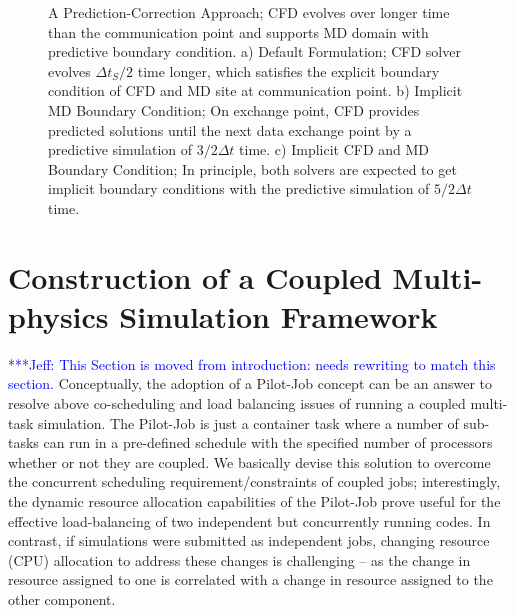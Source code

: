 \documentclass[conference,final]{IEEEtran}
\newcommand{\skonote}[1]{ {\textcolor{blue} { ***Jeff: #1 }}}
\newcommand{\skonote}[1]{}
\begin{document}
\begin{figure}[ht]
\vskip-0.2cm
\caption{\small A Prediction-Correction Approach; CFD evolves over longer time than the communication point and supports MD domain with predictive boundary condition. a) Default Formulation; CFD solver evolves $\Delta t_S / 2$ time longer, which satisfies the explicit boundary condition of CFD and MD site at communication point. b) Implicit MD Boundary Condition; On exchange point, CFD provides predicted solutions until the next data exchange point by a predictive simulation of $3/2 \Delta t$ time. c) Implicit CFD and MD Boundary Condition; In principle, both solvers are expected to get implicit boundary conditions with the predictive simulation of $5/2 \Delta t$ time.}
\label{Hybrid_Timescale2}
\end{figure}




%






\section{Construction of a Coupled Multi-physics Simulation Framework}


\skonote{This Section is moved from introduction: needs rewriting to match this section.}
Conceptually, the adoption of a Pilot-Job concept can be an answer to resolve above co-scheduling and load balancing issues of running a coupled multi-task simulation. The Pilot-Job is just a container task where a number of sub-tasks can run in a pre-defined schedule with the specified number of processors whether or not they are coupled. We basically devise this solution to overcome the concurrent scheduling requirement/constraints of coupled jobs; interestingly, the dynamic resource allocation capabilities of the Pilot-Job prove useful for the effective load-balancing of two independent but concurrently running codes. In contrast, if simulations were submitted as independent jobs, changing resource (CPU) allocation to address these changes is challenging -- as the change in resource assigned to one is correlated with a change in resource assigned to the other component.
\end{document}
